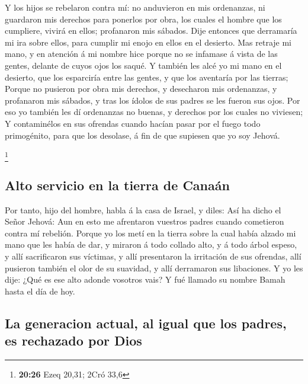  Y los hijos se rebelaron contra mí: no anduvieron en mis
ordenanzas, ni guardaron mis derechos para ponerlos por obra, los cuales
el hombre que los cumpliere, vivirá en ellos; profanaron mis sábados.
Dije entonces que derramaría mi ira sobre ellos, para cumplir mi enojo
en ellos en el desierto.  Mas retraje mi mano, y en
atención á mi nombre hice porque no se infamase á vista de las gentes,
delante de cuyos ojos los saqué.  Y también les alcé yo
mi mano en el desierto, que los esparciría entre las gentes, y que los
aventaría por las tierras;  Porque no pusieron por obra
mis derechos, y desecharon mis ordenanzas, y profanaron mis sábados, y
tras los ídolos de sus padres se les fueron sus ojos. 
Por eso yo también les dí ordenanzas no buenas, y derechos por los
cuales no viviesen;  Y contaminélos en sus ofrendas
cuando hacían pasar por el fuego todo primogénito, para que los
desolase, á fin de que supiesen que yo soy Jehová.

\footnote{\textbf{20:26} Ezeq 20,31; 2Cró 33,6}

\hypertarget{alto-servicio-en-la-tierra-de-canauxe1n}{%
\subsection{Alto servicio en la tierra de
Canaán}\label{alto-servicio-en-la-tierra-de-canauxe1n}}

 Por tanto, hijo del hombre, habla á la casa de Israel, y
diles: Así ha dicho el Señor Jehová: Aun en esto me afrentaron vuestros
padres cuando cometieron contra mí rebelión.  Porque yo
los metí en la tierra sobre la cual había alzado mi mano que les había
de dar, y miraron á todo collado alto, y á todo árbol espeso, y allí
sacrificaron sus víctimas, y allí presentaron la irritación de sus
ofrendas, allí pusieron también el olor de su suavidad, y allí
derramaron sus libaciones.  Y yo les dije: ¿Qué es ese
alto adonde vosotros vais? Y fué llamado su nombre Bamah hasta el día de
hoy.

\hypertarget{la-generacion-actual-al-igual-que-los-padres-es-rechazado-por-dios}{%
\subsection{La generacion actual, al igual que los padres, es rechazado
por
Dios}\label{la-generacion-actual-al-igual-que-los-padres-es-rechazado-por-dios}}


